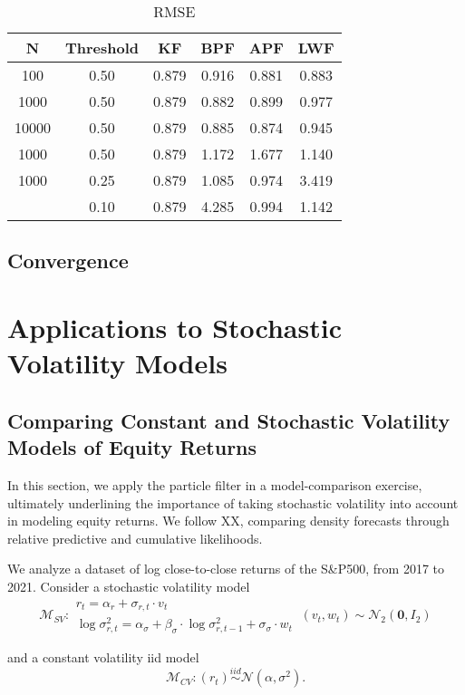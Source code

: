\documentclass[
]{book}
\theoremstyle{break}
\theoremstyle{nonumberplain}
\begin{document}
\begin{longtable}[t]{cccccc}
\caption{\label{tab:unnamed-chunk-37}RMSE}\\
\toprule
N & Threshold & KF & BPF & APF & LWF\\
\midrule
100 & 0.50 & 0.879 & 0.916 & 0.881 & 0.883\\
1000 & 0.50 & 0.879 & 0.882 & 0.899 & 0.977\\
10000 & 0.50 & 0.879 & 0.885 & 0.874 & 0.945\\
1000 & 0.50 & 0.879 & 1.172 & 1.677 & 1.140\\
1000 & 0.25 & 0.879 & 1.085 & 0.974 & 3.419\\
\addlinespace
1000 & 0.10 & 0.879 & 4.285 & 0.994 & 1.142\\
\bottomrule
\end{longtable}

\section{Convergence}\label{pf_converg}

\chapter{Applications to Stochastic Volatility Models}
\section{Comparing Constant and Stochastic Volatility Models of Equity Returns}

In this section, we apply the particle filter in a model-comparison
exercise, ultimately underlining the importance of taking stochastic
volatility into account in modeling equity returns. We follow XX,
comparing density forecasts through relative predictive and cumulative
likelihoods.

We analyze a dataset of log close-to-close returns of the S\&P500, from
2017 to 2021. Consider a stochastic volatility model \[
\mathcal{M}_{SV}:\begin{array}{lc}
r_{t}=\alpha_{r}+\sigma_{r,t}\cdot v_{t}\\
\log\sigma_{r,t}^{2}=\alpha_{\sigma}+\beta_{\sigma}\cdot\log\sigma_{r,t-1}^{2}+\sigma_{\sigma}\cdot w_{t}
\end{array}\ (v_{t},w_{t})\sim\mathcal{N}_{2}(\boldsymbol{0},I_{2})
\]

and a constant volatility iid model \[
\mathcal{M}_{CV}:(r_{t})\overset{iid}{\sim}\mathcal{N}(\alpha,\sigma^{2}).
\]
\end{document}
